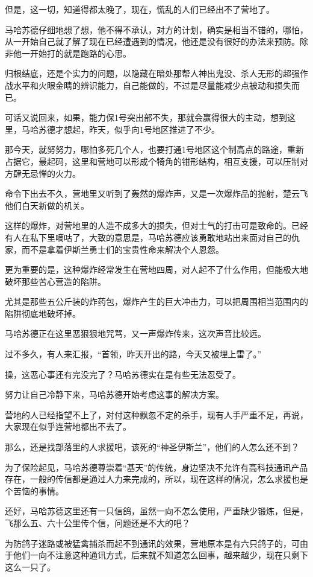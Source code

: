 但是，这一切，知道得都太晚了，现在，慌乱的人们已经出不了营地了。

马哈苏德仔细地想了想，他不得不承认，对方的计划，确实是相当不错的，哪怕，从一开始自己就了解了现在已经遭遇到的情况，他还是没有很好的办法来预防。除非他一开始打的就是跑路的心思。

归根结底，还是个实力的问题，以隐藏在暗处那帮人神出鬼没、杀人无形的超强作战水平和火眼金睛的辨识能力，自己能做的，不过是尽量能减少点被动和损失而已。

可话又说回来，如果，能力保1号突出部不失，那就会赢得很大的主动，想到这里，马哈苏德才想起，昨天，似乎向1号地区推进了不少。

那今天，就努努力，哪怕多死几个人，也要打通1号地区这个制高点的路途，重新占据它，最起码，这里和营地可以形成个犄角的钳形结构，相互支援，可以压制对方肆无忌惮的火力。

命令下出去不久，营地里又听到了轰然的爆炸声，又是一次爆炸品的抛射，楚云飞他们白天新做的机关。

这样的爆炸，对营地里的人造不成多大的损失，但对士气的打击可是致命的。已经有人在私下里嘀咕了，大致的意思是，马哈苏德应该勇敢地站出来面对自己的仇家，而不是拿着伊斯兰勇士们的宝贵性命来解决个人恩怨。

更为重要的是，这种爆炸经常发生在营地四周，对人起不了什么作用，但能极大地破坏那些苦心营造的陷阱。

尤其是那些五公斤装的炸药包，爆炸产生的巨大冲击力，可以把周围相当范围内的陷阱彻底地破坏掉。

马哈苏德正在这里恶狠狠地咒骂，又一声爆炸传来，这次声音比较远。

过不多久，有人来汇报，“首领，昨天开出的路，今天又被埋上雷了。”

操，这恶心事还有完没完了？马哈苏德实在是有些无法忍受了。

努力让自己冷静下来，马哈苏德开始考虑这事的解决方案。

营地的人已经指望不上了，对付这种飘忽不定的杀手，现有人手严重不足，再说，大家现在似乎连营地都出不去了。

那么，还是找部落里的人求援吧，该死的“神圣伊斯兰”，他们的人怎么还不到？

为了保险起见，马哈苏德尊崇着“基天”的传统，身边坚决不允许有高科技通讯产品存在，一般的传信都是通过人力来完成的，所以，现在这样的情况，怎么求援也是个苦恼的事情。

还好，马哈苏德这里还有一只信鸽，虽然一向不怎么使用，严重缺少锻炼，但是，飞那么五、六十公里传个信，问题还是不大的吧？

为防鸽子迷路或被猛禽捕杀而起不到通讯的效果，营地原本是有六只鸽子的，可由于他们一向不注意这种通讯方式，后来就不知道怎么回事，越来越少，现在只剩下这么一只了。

